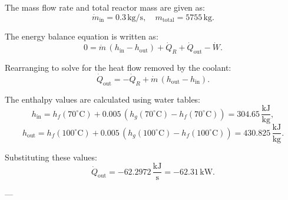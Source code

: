 The mass flow rate and total reactor mass are given as:  
\[
\dot{m}_{\text{in}} = 0.3 \, \text{kg/s}, \quad m_{\text{total}} = 5755 \, \text{kg}.
\]  

The energy balance equation is written as:  
\[
0 = \dot{m} \, (h_{\text{in}} - h_{\text{out}}) + \dot{Q}_R + \dot{Q}_{\text{out}} - \dot{W}.
\]  

Rearranging to solve for the heat flow removed by the coolant:  
\[
\dot{Q}_{\text{out}} = -\dot{Q}_R + \dot{m} \, (h_{\text{out}} - h_{\text{in}}).
\]  

The enthalpy values are calculated using water tables:  
\[
h_{\text{in}} = h_f(70^\circ\text{C}) + 0.005 \, (h_g(70^\circ\text{C}) - h_f(70^\circ\text{C})) = 304.65 \, \frac{\text{kJ}}{\text{kg}},
\]  
\[
h_{\text{out}} = h_f(100^\circ\text{C}) + 0.005 \, (h_g(100^\circ\text{C}) - h_f(100^\circ\text{C})) = 430.825 \, \frac{\text{kJ}}{\text{kg}}.
\]  

Substituting these values:  
\[
\dot{Q}_{\text{out}} = -62.2972 \, \frac{\text{kJ}}{\text{s}} = -62.31 \, \text{kW}.
\]  

---